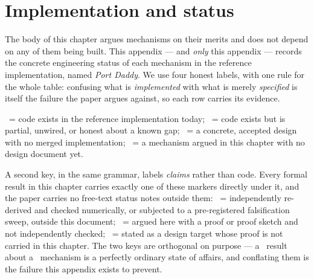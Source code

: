 \documentclass[11pt,a4paper]{article}
\theoremstyle{definition}
\theoremstyle{plain}
\begin{document}
\appendix

\section{Implementation and status}\label{app:honest}

The body of this chapter argues mechanisms on their merits and does not depend on any of
them being built. This appendix --- and \emph{only} this appendix --- records the
concrete engineering status of each mechanism in the reference implementation, named
\emph{Port Daddy}. We use four honest labels, with one rule for the whole table:
confusing what is \emph{implemented} with what is merely \emph{specified} is itself
the failure the paper argues against, so each row carries its evidence.

\smallskip
\noindent\Built\ = code exists in the reference implementation today; \BuiltWeak\ =
code exists but is partial, unwired, or honest about a known gap; \Designed\ = a
concrete, accepted design with no merged implementation; \Vision\ = a mechanism argued
in this chapter with no design document yet.

\smallskip
\noindent A second key, in the same grammar, labels \emph{claims} rather than code.
Every formal result in this chapter carries exactly one of these markers directly under
it, and the paper carries no free-text status notes outside them:
\Verified\ = independently re-derived and checked numerically, or subjected to a
pre-registered falsification sweep, outside this document; \Proved\ = argued here with
a proof or proof sketch and not independently checked; \Unproved\ = stated as a design
target whose proof is not carried in this chapter. The two keys are orthogonal on
purpose --- a \Verified\ result about a \Vision\ mechanism is a perfectly ordinary
state of affairs, and conflating them is the failure this appendix exists to prevent.
\end{document}
